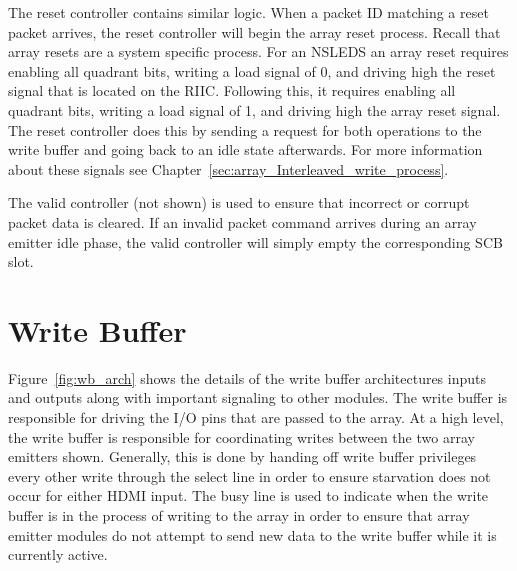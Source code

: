     The reset controller contains similar logic. When a packet ID matching a reset packet arrives, the reset controller will begin the array reset process. Recall that array resets are a system specific process. For an NSLEDS an array reset requires enabling all quadrant bits, writing a load signal of 0, and driving high the reset signal that is located on the RIIC. Following this, it requires enabling all quadrant bits, writing a load signal of 1, and driving high the array reset signal. The reset controller does this by sending a request for both operations to the write buffer and going back to an idle state afterwards. For more information about these signals see Chapter~\ref{sec:array_Interleaved_write_process}.

    The valid controller (not shown) is used to ensure that incorrect or corrupt packet data is cleared. If an invalid packet command arrives during an array emitter idle phase, the valid controller will simply empty the corresponding SCB slot.

\section{Write Buffer}

    Figure~\ref{fig:wb_arch} shows the details of the write buffer architectures inputs and outputs along with important signaling to other modules. The write buffer is responsible for driving the I/O pins that are passed to the array. At a high level, the write buffer is responsible for coordinating writes between the two array emitters shown. Generally, this is done by handing off write buffer privileges every other write through the select line in order to ensure starvation does not occur for either HDMI input. The busy line is used to indicate when the write buffer is in the process of writing to the array in order to ensure that array emitter modules do not attempt to send new data to the write buffer while it is currently active.


